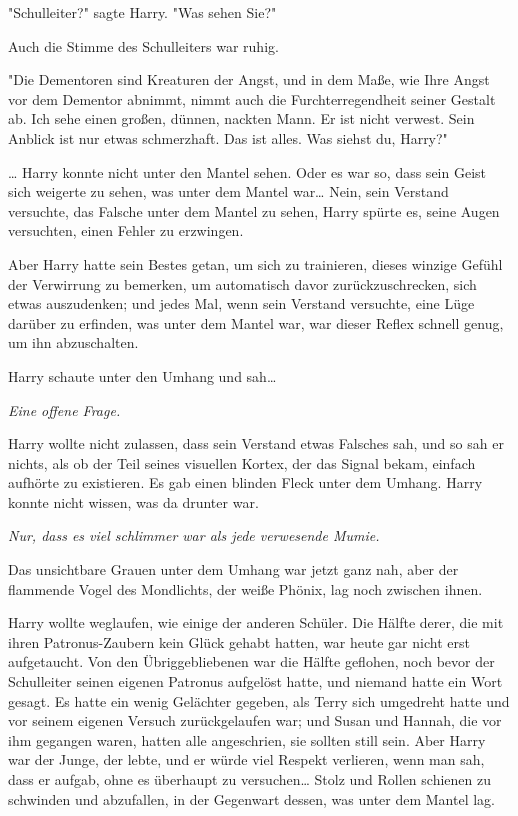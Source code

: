 {"Schulleiter?" sagte Harry. "Was sehen Sie?"

Auch die Stimme des Schulleiters war ruhig.

"Die Dementoren sind Kreaturen der Angst, und in dem Maße, wie Ihre Angst vor dem Dementor abnimmt, nimmt auch die Furchterregendheit seiner Gestalt ab. Ich sehe einen großen, dünnen, nackten Mann. Er ist nicht verwest. Sein Anblick ist nur etwas schmerzhaft. Das ist alles. Was siehst du, Harry?"

… Harry konnte nicht unter den Mantel sehen. Oder es war so, dass sein Geist sich weigerte zu sehen, was unter dem Mantel war… Nein, sein Verstand versuchte, das Falsche unter dem Mantel zu sehen, Harry spürte es, seine Augen versuchten, einen Fehler zu erzwingen.

Aber Harry hatte sein Bestes getan, um sich zu trainieren, dieses winzige Gefühl der Verwirrung zu bemerken, um automatisch davor zurückzuschrecken, sich etwas auszudenken; und jedes Mal, wenn sein Verstand versuchte, eine Lüge darüber zu erfinden, was unter dem Mantel war, war dieser Reflex schnell genug, um ihn abzuschalten.

Harry schaute unter den Umhang und sah…

\emph{Eine offene Frage.}

Harry wollte nicht zulassen, dass sein Verstand etwas Falsches sah, und so sah er nichts, als ob der Teil seines visuellen Kortex, der das Signal bekam, einfach aufhörte zu existieren. Es gab einen blinden Fleck unter dem Umhang. Harry konnte nicht wissen, was da drunter war.

\emph{Nur, dass es viel schlimmer war als jede verwesende Mumie.}

Das unsichtbare Grauen unter dem Umhang war jetzt ganz nah, aber der flammende Vogel des Mondlichts, der weiße Phönix, lag noch zwischen ihnen.

Harry wollte weglaufen, wie einige der anderen Schüler. Die Hälfte derer, die mit ihren Patronus-Zaubern kein Glück gehabt hatten, war heute gar nicht erst aufgetaucht. Von den Übriggebliebenen war die Hälfte geflohen, noch bevor der Schulleiter seinen eigenen Patronus aufgelöst hatte, und niemand hatte ein Wort gesagt. Es hatte ein wenig Gelächter gegeben, als Terry sich umgedreht hatte und vor seinem eigenen Versuch zurückgelaufen war; und Susan und Hannah, die vor ihm gegangen waren, hatten alle angeschrien, sie sollten still sein. Aber Harry war der Junge, der lebte, und er würde viel Respekt verlieren, wenn man sah, dass er aufgab, ohne es überhaupt zu versuchen… Stolz und Rollen schienen zu schwinden und abzufallen, in der Gegenwart dessen, was unter dem Mantel lag.

}
